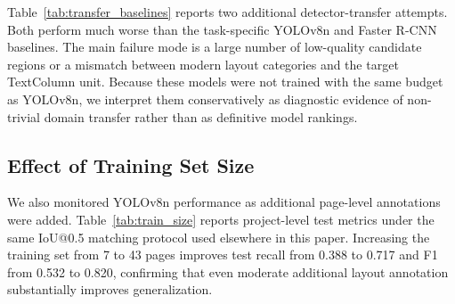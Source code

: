 \documentclass[12pt]{article}
\begin{document}
Table~\ref{tab:transfer_baselines} reports two additional detector-transfer attempts. Both perform much worse than the task-specific YOLOv8n and Faster R-CNN baselines. The main failure mode is a large number of low-quality candidate regions or a mismatch between modern layout categories and the target TextColumn unit. Because these models were not trained with the same budget as YOLOv8n, we interpret them conservatively as diagnostic evidence of non-trivial domain transfer rather than as definitive model rankings.


\begin{table}[t]
\centering
\caption{Supplementary strict-localization comparison at IoU@0.75. Compared with Table~\ref{tab:main_results}, the stricter threshold penalizes boundary errors more heavily.}
\label{tab:iou75}
\end{table}


\begin{table}[t]
\centering
\caption{Page-level bootstrap 95\% confidence intervals on the 11-page test split.}
\label{tab:bootstrap_ci}
\end{table}


\subsection{Effect of Training Set Size}
We also monitored YOLOv8n performance as additional page-level annotations were added. Table~\ref{tab:train_size} reports project-level test metrics under the same IoU@0.5 matching protocol used elsewhere in this paper. Increasing the training set from 7 to 43 pages improves test recall from 0.388 to 0.717 and F1 from 0.532 to 0.820, confirming that even moderate additional layout annotation substantially improves generalization.
\end{document}
